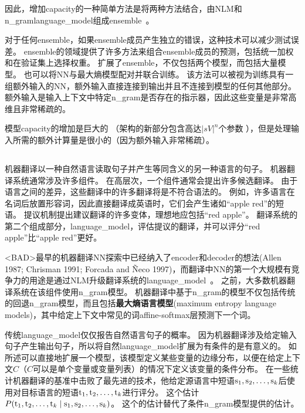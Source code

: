 因此，增加\gls{capacity}的一种简单方法是将两种方法结合，由\gls{NLM}和\gls{n_gram}\gls{language_model}组成\gls{ensemble}~\citep{BenDucVin01-small,Bengio-nnlm2003-small}。

对于任何\gls{ensemble}，如果\gls{ensemble}成员产生独立的错误，这种技术可以减少测试误差。
\gls{ensemble}的领域提供了许多方法来组合\gls{ensemble}成员的预测，包括统一加权和在验证集上选择权重。
\citet{Mikolov-Interspeech-2011} 扩展了\gls{ensemble}，不仅包括两个模型，而包括大量模型。
也可以将\gls{NN}与最大熵模型配对并联合训练\citep{Mikolov-ASRU-2011}。
该方法可以被视为训练具有一组额外输入的\gls{NN}，额外输入直接连接到输出并且不连接到模型的任何其他部分。
额外输入是输入上下文中特定\gls{n_gram}是否存在的指示器，因此这些变量是非常高维且非常稀疏的。

模型\gls{capacity}的增加是巨大的 （架构的新部分包含高达$| sV |^n$个参数 ），但是处理输入所需的额外计算量是很小的（因为额外输入非常稀疏）。

\subsection{}
\label{sec:neural_machine_translation}

机器翻译以一种自然语言读取句子并产生等同含义的另一种语言的句子。
机器翻译系统通常涉及许多组件。
在高层次，一个组件通常会提出许多候选翻译。
由于语言之间的差异，这些翻译中的许多翻译将是不符合语法的。
例如，许多语言在名词后放置形容词，因此直接翻译成英语时，它们会产生诸如``apple red''的短语。
提议机制提出建议翻译的许多变体，理想地应包括``red apple''。
翻译系统的第二个组成部分，\gls{language_model}，评估提议的翻译，并可以评分``red apple''比``apple red''更好。


<BAD>最早的机器翻译\gls{NN}探索中已经纳入了\gls{encoder}和\gls{decoder}的想法(Allen 1987; Chrisman 1991; Forcada
and Ñeco 1997)，而翻译中\gls{NN}的第一个大规模有竞争力的用途是通过\gls{NLM}升级翻译系统的\gls{language_model}~\citep{Schwenk-et-al-IWSLT2006,Schwenk-2010}。
之前，大多数机器翻译系统在该组件使用\gls{n_gram}模型。
机器翻译中基于\gls{n_gram}的模型不仅包括传统的回退\gls{n_gram}模型，而且包括\textbf{最大熵语言模型}(maximum entropy language models)，其中给定上下文中常见的词affine-softmax层预测下一个词。

传统\gls{language_model}仅仅报告自然语言句子的概率。
因为机器翻译涉及给定输入句子产生输出句子，所以将自然\gls{language_model}扩展为有条件的是有意义的。
如所述可以直接地扩展一个模型，该模型定义某些变量的边缘分布，以便在给定上下文$C$（$C$可以是单个变量或变量列表）的情况下定义该变量的条件分布。
\citet{Devlin-et-al-ACL2014}在一些统计机器翻译的基准中击败了最先进的技术，他给定源语言中短语$\mathrm{s}_1, \mathrm{s}_2,\ldots, \mathrm{s}_k$后使用对目标语言的短语$\mathrm{t}_1, \mathrm{t}_2,\ldots, \mathrm{t}_k$进行评分。
这个估计$P(\mathrm{t}_1, \mathrm{t}_2,\ldots, \mathrm{t}_k \mid \mathrm{s}_1, \mathrm{s}_2,\ldots, \mathrm{s}_k)$。
这个的估计替代了条件\gls{n_gram}模型提供的估计。


